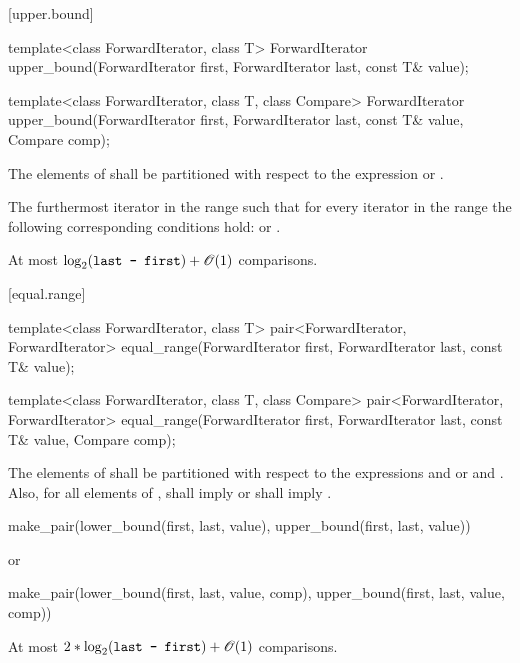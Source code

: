 [upper.bound]{}

%
\begin{itemdecl}
template<class ForwardIterator, class T>
  ForwardIterator
    upper_bound(ForwardIterator first, ForwardIterator last,
                const T& value);

template<class ForwardIterator, class T, class Compare>
  ForwardIterator
    upper_bound(ForwardIterator first, ForwardIterator last,
                const T& value, Compare comp);
\end{itemdecl}

\begin{itemdescr}
\pnum
\requires
The elements
of
shall be partitioned with respect to the expression
or
.

\pnum
\returns
The furthermost iterator
in the range
such that for every iterator
in the range
the following corresponding conditions hold:
or
.

\pnum
\complexity
At most
$\log_2(\texttt{last - first}) + \mathscr{O}(1)$
comparisons.
\end{itemdescr}

[equal.range]{}

%
\begin{itemdecl}
template<class ForwardIterator, class T>
  pair<ForwardIterator, ForwardIterator>
    equal_range(ForwardIterator first,
                ForwardIterator last, const T& value);

template<class ForwardIterator, class T, class Compare>
  pair<ForwardIterator, ForwardIterator>
    equal_range(ForwardIterator first,
                ForwardIterator last, const T& value,
                Compare comp);
\end{itemdecl}

\begin{itemdescr}
\pnum
\requires
The elements
of
shall be partitioned with respect to the expressions
and
or
and
.
Also, for all elements
of
\tcode{[first, last)},
shall imply
or
shall imply
.

\pnum
\returns
\begin{codeblock}
make_pair(lower_bound(first, last, value),
          upper_bound(first, last, value))
\end{codeblock}
or
\begin{codeblock}
make_pair(lower_bound(first, last, value, comp),
          upper_bound(first, last, value, comp))
\end{codeblock}

\pnum
\complexity
At most
$2 * \log_2(\texttt{last - first}) + \mathscr{O}(1)$
comparisons.
\end{itemdescr}

